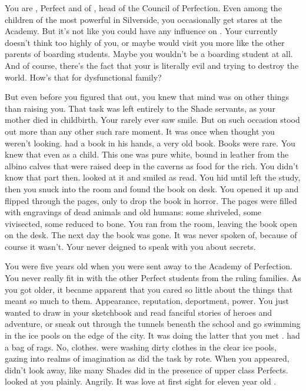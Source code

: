 \documentclass[char]{Silversiders}
\begin{document}
\name{\cTruth{}}

You are \cTruth{}, Perfect and \cTruth{\offspring} of \cDeath{\intro}, head of the Council of Perfection. Even among the children of the most powerful in Silverside, you occasionally get stares at the Academy. But it's not like you could have any influence on \cDeath{\them}. Your \cDeath{\parent} currently doesn't think too highly of you, or maybe \cDeath{\they} would visit you more like the other parents of boarding students. Maybe you wouldn't be a boarding student at all. And of course, there's the fact that your \cDeath{\parent} is literally evil and trying to destroy the world. How's that for dysfunctional family? 

But even before you figured that out, you knew that \cDeath{\their} mind was on other things than raising you. That task was left entirely to the Shade servants, as your mother died in childbirth. Your rarely ever saw \cDeath{\them} smile. But on such occasion stood out more than any other such rare moment. It was once when \cDeath{\they} thought you weren't looking. \cDeath{\They} had a book in his hands, a very old book. Books were rare. You knew that even as a child. This one was pure white, bound in leather from the albino calves that were raised deep in the caverns as food for the rich. You didn't know that part then. \cDeath{\They} looked at it and smiled as \cDeath{\they} read. You hid until \cDeath{\they} left the study, then you snuck into the room and found the book on \cDeath{\their} desk. You opened it up and flipped through the pages, only to drop the book in horror. The pages were filled with engravings of dead animals and old humans: some shriveled, some vivisected, some reduced to bone. You ran from the room, leaving the book open on the desk. The next day the book was gone. It was never spoken of, because of course it wasn't. Your \cDeath{\parent} never deigned to speak with you about \cDeath{\their} secrets.

You were five years old when you were sent away to the Academy of Perfection. You never really fit in with the other Perfect students from the ruling families. As you got older, it became apparent that you cared so little about the things that meant so much to them. Appearance, reputation, deportment, power. You just wanted to draw in your sketchbook and read fanciful stories of heroes and adventure, or sneak out through the tunnels beneath the school and go swimming in the ice pools on the edge of the city. It was doing the latter that you met \cWisdom{}. \cWisdom{\They} had a bag of rags. No, clothes. \cWisdom{\They} were washing dirty clothes in the clear ice pools, gazing into realms of imagination as \cWisdom{\they} did the task by rote. When you appeared, \cWisdom{} didn't look away, like many Shades did in the presence of upper class Perfects. \cWisdom{\They} looked at you plainly. Angrily. It was love at first sight for eleven year old \cTruth{}.
\end{document}
